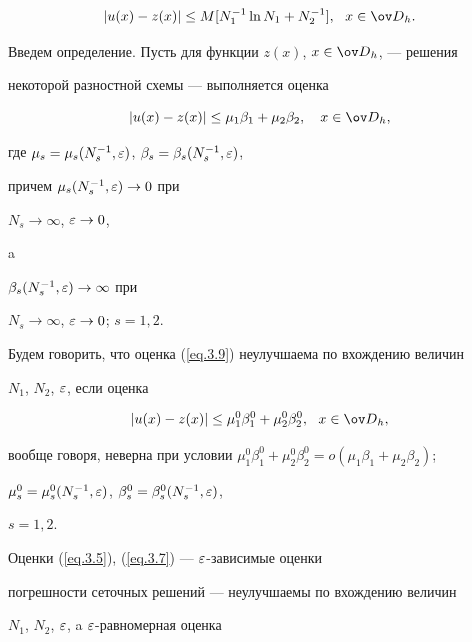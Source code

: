 \begin{equation} \label{eq.3.8}


|u(x)-z(x)|\leq M [N_1^{-1} \ln N_1 + N_2^{-1}],\ \ x\in \od_h.


\end{equation}





Введем определение. Пусть для функции $z(x)$, $x \in \od_h$, --- решения


некоторой разностной схемы --- выполняется оценка


\begin{equation} \label{eq.3.9}


|u(x)-z(x)|\leq \mu_1 \beta_1 + \mu_2 \beta_2, \ \ \ x\in \od_h,


\end{equation}


где $\mu_s =\mu_s (N^{-1}_s,\varepsilon)$, $\beta_s =\beta_s (N^{-1}_s,\varepsilon)$,


причем $\mu_s (N_s^{-1},\varepsilon) \rightarrow 0$ при


$N_s \rightarrow \infty$, $\varepsilon \rightarrow 0$,


a


$\beta_s (N_s^{-1}, \varepsilon) \rightarrow \infty$ при


$N_s \rightarrow \infty$, $\varepsilon \rightarrow 0$; $s=1,2$.


Будем говорить, что оценка (\ref{eq.3.9}) неулучшаема по вхождению величин


$N_1$, $N_2$, $\varepsilon$, если оценка


$$


|u(x)-z(x)| \leq \mu^0_1 \beta^0_1 + \mu^0_2 \beta^0_2, \ \ 


x\in \od_h,


$$


вообще говоря, неверна при условии $\mu^0_1\beta^0_1+\mu^0_2\beta^0_2=


o(\mu_1 \beta_1 + \mu_2 \beta_2)$;


$\mu^0_s=\mu^0_s(N^{-1}_s, \varepsilon)$, $\beta^0_s=\beta^0_s(N^{-1}_s, \varepsilon)$,


$s=1,2$.





Оценки (\ref{eq.3.5}), (\ref{eq.3.7}) --- $\varepsilon$-зависимые оценки


погрешности сеточных решений --- неулучшаемы по вхождению величин


$N_1$, $N_2$, $\varepsilon$, a $\varepsilon$-равномерная оценка



